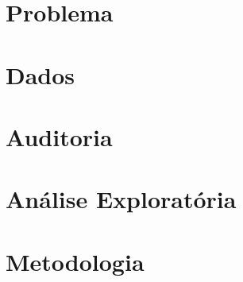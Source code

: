 \documentclass[
    10pt,
    aspectratio=169
]{beamer}
\title{\ProjectTitle}
\subtitle{\ProjectSubtitle}
\author{\ProjectMembers}
\date{\ProjectYear}
\begin{document}





\section{Problema}





\section{Dados}





\section{Auditoria}





\section{Análise Exploratória}





\section{Metodologia}


\end{document}

